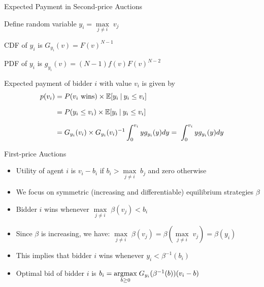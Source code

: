 \documentclass[11pt,aspectratio=169,handout]{beamer}
\begin{document}
  \begin{frame}{Expected Payment in Second-price Auctions}
   \begin{itemizes}[1em]
    \item Define random variable $y_i = \underset{j \ne i}{\max} \; v_j$
    \begin{itemizes}[0.7em]
     \item CDF of $y_i$ is $G_{y_i}(v) = F(v)^{N-1}$
     \item PDF of $y_i$ is $g_{y_i}(v) = (N-1)f(v)F(v)^{N-2}$
    \end{itemizes}
    \item Expected payment of bidder $i$ with value $v_i$ is given by
    \begin{align*}
     p(v_i) &= P(v_i\text{ wins})\times \mathbb{E}[y_i \:\vert\: y_i\le v_i]\\[0.7em]
     &= P(y_i\le v_i)\times \mathbb{E}[y_i \:\vert\: y_i\le v_i]\\[0.7em]
     &= G_{y_i}(v_i)\times G_{y_i}(v_i)^{-1}\int_0^{v_i}yg_{y_i}(y)dy = \; \int_0^{v_i}yg_{y_i}(y)dy
    \end{align*}
   \end{itemizes}
  \end{frame}
  
  
  \begin{frame}{First-price Auctions}
   \begin{itemize}[<+->]
   \setlength{\itemsep}{0.8em}
    \item Utility of agent $i$ is $v_i-b_i$ if $b_i > \underset{j\ne i}{\max} \; b_j$ and zero otherwise
    \item We focus on symmetric (increasing and differentiable) equilibrium strategies $\beta$
    \item Bidder $i$ wins whenever $\underset{j\ne i}{\max} \; \beta(v_j) < b_i$
    \item Since $\beta$ is increasing, we have: $\underset{j\ne i}{\max} \; \beta(v_j) = \beta(\underset{j\ne i}{\max} \; v_j) = \beta (y_i)$
    \item This implies that bidder $i$ wins whenever $y_i < \beta^{-1}(b_i)$
    \item Optimal bid of bidder $i$ is $b_i = \underset{b \ge 0}{\operatorname*{argmax}} \; G_{y_i} (\beta^{-1}(b))(v_i - b)$
   \end{itemize}
  \end{frame}
\end{document}
